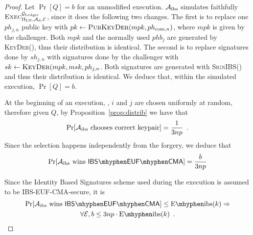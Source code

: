   \begin{proof}
    Let $\Pr[Q] = b$ for an unmodified execution. $\mathcal{A}_{\mathrm{ibs}}$
    simulates faithfully $\textsc{Exec}^{\mathcal{G}_{\mathrm{Ledger}}}_{\Pi_{\mathrm{LN}},
    \mathcal{A}_{\mathrm{d}}, \mathcal{E}}$, since it does the following two
    changes. The first is to replace one $ph_{j, n}$ public key with $pk \gets
    \textsc{PubKeyDer}(mpk, ph_{\mathrm{com}, n})$, where $mpk$ is given by the
    challenger. Both $mpk$ and the normally used $phb_j$ are generated by
    \textsc{KeyDer}(), thus their distribution is identical. The second is to
    replace signatures done by $sh_{j, n}$ with signatures done by the
    challenger with $sk \gets \textsc{KeyDer}(mpk, msk, ph_{j, n}$. Both
    signatures are generated with \textsc{SignIBS}() and thus their distribution
    is identical. We deduce that, within the simulated execution, $\Pr[Q] = b$.

    At the beginning of an execution, \alice, $i$ and $j$ are chosen uniformly
    at random, therefore given $Q$, by Proposition~\ref{prop:distrib} we have
    that
    \begin{equation*}
      \Pr[\mathcal{A}_{\mathrm{ibs}} \text{ chooses correct keypair}] =
      \frac{1}{3np} \enspace.
    \end{equation*}
    Since the selection happens independently from the forgery, we deduce that
    \begin{equation*}
      \Pr[\adversary_{\mathrm{ibs}} \text{ wins } \mathsf{IBS \mhyphen EUF
      \mhyphen CMA}] = \frac{b}{3np}
    \end{equation*}

    Since the Identity Based Signatures scheme used during the execution is
    assumed to be \textsf{IBS-EUF-CMA}-secure, it is
    \begin{gather*}
      \Pr[\adversary_{\mathrm{ibs}} \text{ wins } \mathsf{IBS \mhyphen EUF
      \mhyphen CMA}] \leq \mathrm{E \mhyphen ibs}(k) \Rightarrow \\ \forall
      \environment, b \leq 3np \cdot \mathrm{E \mhyphen ibs}(k) \enspace.
    \end{gather*}
  \end{proof}

